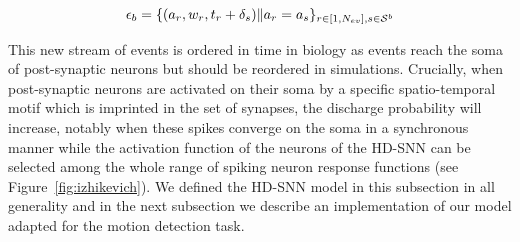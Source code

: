 \documentclass[default]{sn-jnl}%
\theoremstyle{thmstyleone}%
\theoremstyle{thmstyletwo}%
\theoremstyle{thmstylethree}%
\newcommand{\note}[1]{{\sethlcolor{yellow}\hl{#1}}}
\begin{document}
\begin{equation}\label{eq:stream_b}
\epsilon_b = \{(a_r, w_r, t_r+\delta_s) \| a_r = a_s \}_{r \in [1,N_{ev}], s \in \mathcal{S}^b}
\end{equation}

This new stream of events is ordered in time in biology as events reach the soma of post-synaptic neurons but should be reordered in simulations. Crucially, when post-synaptic neurons are activated on their soma by a specific spatio-temporal motif which is imprinted in the set of synapses, the discharge probability will increase, notably when these spikes converge on the soma in a synchronous manner while the activation function of the neurons of the HD-SNN can be selected among the whole range of spiking neuron response functions (see Figure~\ref{fig:izhikevich}). We defined the HD-SNN model in this subsection in all generality and in the next subsection we describe an implementation of our model adapted for the motion detection task. 
%
%
\end{document}
